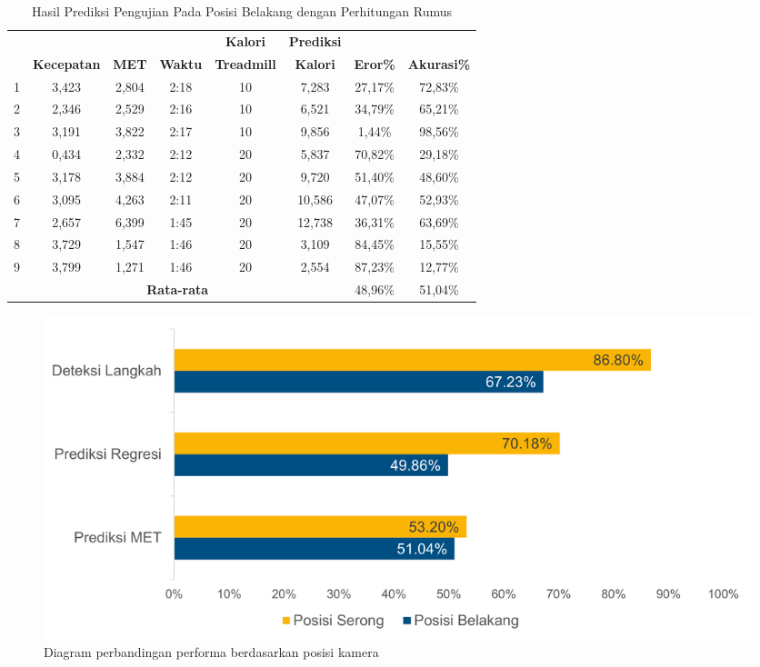 \begin{longtable}{|c|c|c|c|c|c|c|c|}
  \caption{Hasil Prediksi Pengujian Pada Posisi Belakang dengan Perhitungan Rumus}
  \label{tb:PengujianPosisiBelakangAnalisaPrediksiPerhitungan}                                   \\
  \hline
  \rowcolor[HTML]{C0C0C0}
  & & & & \textbf{Kalori} & \textbf{Prediksi} & & \\
  \rowcolor[HTML]{C0C0C0}
  \multirow{-2}{*}{\textbf{Percobaan}} & \multirow{-2}{*}{\textbf{Kecepatan}} & \multirow{-2}{*}{\textbf{MET}} & \multirow{-2}{*}{\textbf{Waktu}} & \textbf{Treadmill} & \textbf{Kalori} & \multirow{-2}{*}{\textbf{Eror\%}} & \multirow{-2}{*}{\textbf{Akurasi\%}} \\
  \hline
  1   & 3,423   & 2,804    & 2:18    & 10   & 7,283    & 27,17\%      & 72,83\%   \\
  \hline
  2   & 2,346   & 2,529    & 2:16    & 10   & 6,521    & 34,79\%      & 65,21\%   \\
  \hline
  3   & 3,191   & 3,822    & 2:17    & 10   & 9,856    & 1,44\%       & 98,56\%   \\
  \hline
  4   & 0,434   & 2,332    & 2:12    & 20   & 5,837    & 70,82\%      & 29,18\%   \\
  \hline
  5   & 3,178   & 3,884    & 2:12    & 20   & 9,720    & 51,40\%      & 48,60\%   \\
  \hline
  6   & 3,095   & 4,263    & 2:11    & 20   & 10,586   & 47,07\%      & 52,93\%   \\
  \hline
  7   & 2,657   & 6,399    & 1:45    & 20   & 12,738   & 36,31\%      & 63,69\%   \\
  \hline
  8   & 3,729   & 1,547    & 1:46    & 20   & 3,109    & 84,45\%      & 15,55\%   \\
  \hline
  9   & 3,799   & 1,271    & 1:46    & 20   & 2,554    & 87,23\%      & 12,77\%   \\
  \hline

  \multicolumn{6}{|c|}{\textbf{Rata-rata}} & 48,96\% & 51,04\%  \\
  \hline
\end{longtable}

\begin{figure}[H]
  \centering
  \includegraphics[scale=0.7]{gambar/diagram_posisi.png}
  \caption{Diagram perbandingan performa berdasarkan posisi kamera}
  \label{fig:DiagramPosisi}
\end{figure}

